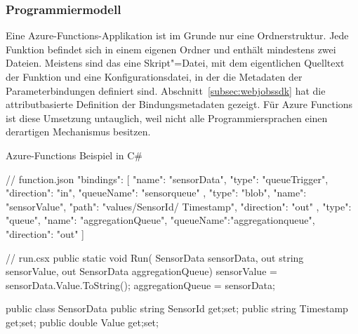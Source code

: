 \subsubsection{Programmiermodell}

Eine Azure-Functions-Applikation ist im Grunde nur eine Ordnerstruktur. Jede Funktion befindet sich in einem eigenen Ordner und enthält mindestens zwei Dateien. Meistens sind das eine Skript"=Datei, mit dem eigentlichen Quelltext der Funktion und eine Konfigurationsdatei, in der die Metadaten der Parameterbindungen definiert sind. Abschnitt~\ref{subsec:webjobssdk} hat die attributbasierte Definition der Bindungsmetadaten gezeigt. Für Azure Functions ist diese Umsetzung untauglich, weil nicht alle Programmiersprachen einen derartigen Mechanismus besitzen.

\begin{program}[!hbt]
\caption{Azure-Functions Beispiel in C\#}
\label{prog:azfun-sensor}
\noindent\begin{minipage}[t]{.49\textwidth}
\lstset{xleftmargin=0.0cm,framexleftmargin=0.0cm}
\begin{CsCode}[numbers=none]
// function.json
{
  "bindings": [
    { "name": "sensorData",
      "type": "queueTrigger",
      "direction": "in",
      "queueName": "sensorqueue" 
		},
    { "type": "blob",
      "name": "sensorValue",
      "path": "values/{SensorId}/
			         {Timestamp}",
      "direction": "out"
    },
    { "type": "queue",
      "name": "aggregationQueue",
      "queueName":"aggregationqueue",
      "direction": "out"
    }
  ]
}
\end{CsCode}
\end{minipage}\hfill
\begin{minipage}[t]{.48\textwidth}
\lstset{showlines=true,xleftmargin=0.0cm,framexleftmargin=0.0cm}
\begin{CsCode}[numbers=none]
// run.csx
public static void Run(
  SensorData sensorData, 
  out string sensorValue, 
  out SensorData aggregationQueue) {
    sensorValue = 
      sensorData.Value.ToString();
    aggregationQueue = sensorData;
}

public class SensorData {
  public string SensorId {get;set;}
  public string Timestamp {get;set;}
  public double Value {get;set;}
}






\end{CsCode} %
\end{minipage}
\end{program}

